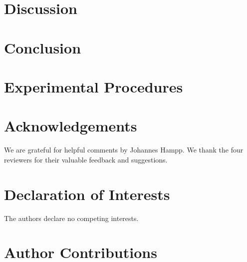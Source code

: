 \documentclass[12pt,preprint]{elsarticle}
\begin{document}





\section*{Discussion}
\label{sec:discussion}



\section*{Conclusion}
\label{sec:conclusion}



\section*{Experimental Procedures}
\label{sec:methods}



\section*{Acknowledgements}

We are grateful for helpful comments by Johannes Hampp. We thank the four
reviewers for their valuable feedback and suggestions.

\section*{Declaration of Interests}

The authors declare no competing interests.



\section*{Author Contributions}
\end{document}
